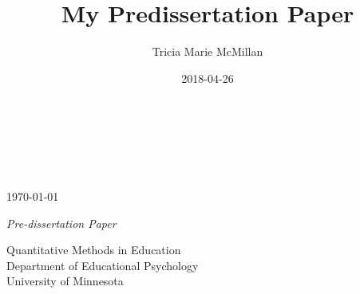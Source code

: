 \documentclass[12pt,letterpaper,oneside,oldfontcommands]{memoir}
\title{My Predissertation Paper}
\author{Tricia Marie McMillan}
\date{2018-04-26}
\theoremstyle{definition}
\theoremstyle{definition}
\theoremstyle{definition}
\theoremstyle{remark}
\begin{document}
\maketitle

\pagestyle{empty}




\begin{center}
{\Huge \textcolor{smartblue}{{\textsc{\MakeTextUppercase{{\thetitle}}}}}\\}


\vskip 1in
{\LARGE {}}\\
\vskip 0.75in
\theauthor \\
\monthyeardate\today

\vskip 0.75in
\textit{Pre-dissertation Paper} \\

\vskip 0.75in

Quantitative Methods in Education \\[2ex]
Department of Educational Psychology \\[-1.5ex]
University of Minnesota

\vfill

\end{center}

\makeatletter




\clearpage

\begin{abstract}

\begingroup
\obeylines
%
\endgroup%

\end{abstract}



\end{document}
